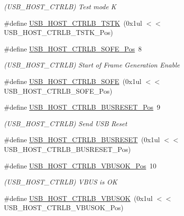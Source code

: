 \begin{DoxyCompactItemize}
\begin{DoxyCompactList}\small\item\em (U\+S\+B\+\_\+\+H\+O\+S\+T\+\_\+\+C\+T\+R\+LB) Test mode K \end{DoxyCompactList}\item 
\#define \mbox{\hyperlink{group___s_a_m_d21___u_s_b_ga57d13e780ef59d8be1e7df0109e82893}{U\+S\+B\+\_\+\+H\+O\+S\+T\+\_\+\+C\+T\+R\+L\+B\+\_\+\+T\+S\+TK}}~(0x1ul $<$$<$ U\+S\+B\+\_\+\+H\+O\+S\+T\+\_\+\+C\+T\+R\+L\+B\+\_\+\+T\+S\+T\+K\+\_\+\+Pos)
\item 
\#define \mbox{\hyperlink{group___s_a_m_d21___u_s_b_gae4d95883d4ad56f9856b6e00dfb86871}{U\+S\+B\+\_\+\+H\+O\+S\+T\+\_\+\+C\+T\+R\+L\+B\+\_\+\+S\+O\+F\+E\+\_\+\+Pos}}~8
\begin{DoxyCompactList}\small\item\em (U\+S\+B\+\_\+\+H\+O\+S\+T\+\_\+\+C\+T\+R\+LB) Start of Frame Generation Enable \end{DoxyCompactList}\item 
\#define \mbox{\hyperlink{group___s_a_m_d21___u_s_b_ga385275d4296469359bbde42207566864}{U\+S\+B\+\_\+\+H\+O\+S\+T\+\_\+\+C\+T\+R\+L\+B\+\_\+\+S\+O\+FE}}~(0x1ul $<$$<$ U\+S\+B\+\_\+\+H\+O\+S\+T\+\_\+\+C\+T\+R\+L\+B\+\_\+\+S\+O\+F\+E\+\_\+\+Pos)
\item 
\#define \mbox{\hyperlink{group___s_a_m_d21___u_s_b_ga926f0460d7d0258193ba846808be7267}{U\+S\+B\+\_\+\+H\+O\+S\+T\+\_\+\+C\+T\+R\+L\+B\+\_\+\+B\+U\+S\+R\+E\+S\+E\+T\+\_\+\+Pos}}~9
\begin{DoxyCompactList}\small\item\em (U\+S\+B\+\_\+\+H\+O\+S\+T\+\_\+\+C\+T\+R\+LB) Send U\+SB Reset \end{DoxyCompactList}\item 
\#define \mbox{\hyperlink{group___s_a_m_d21___u_s_b_gaacb998f960d58b73fd84aa4746026de7}{U\+S\+B\+\_\+\+H\+O\+S\+T\+\_\+\+C\+T\+R\+L\+B\+\_\+\+B\+U\+S\+R\+E\+S\+ET}}~(0x1ul $<$$<$ U\+S\+B\+\_\+\+H\+O\+S\+T\+\_\+\+C\+T\+R\+L\+B\+\_\+\+B\+U\+S\+R\+E\+S\+E\+T\+\_\+\+Pos)
\item 
\#define \mbox{\hyperlink{group___s_a_m_d21___u_s_b_ga053fa0f43fd5f012f1a40d99b740f212}{U\+S\+B\+\_\+\+H\+O\+S\+T\+\_\+\+C\+T\+R\+L\+B\+\_\+\+V\+B\+U\+S\+O\+K\+\_\+\+Pos}}~10
\begin{DoxyCompactList}\small\item\em (U\+S\+B\+\_\+\+H\+O\+S\+T\+\_\+\+C\+T\+R\+LB) V\+B\+US is OK \end{DoxyCompactList}\item 
\#define \mbox{\hyperlink{group___s_a_m_d21___u_s_b_gaefdde4c742f32db15403c5887913e226}{U\+S\+B\+\_\+\+H\+O\+S\+T\+\_\+\+C\+T\+R\+L\+B\+\_\+\+V\+B\+U\+S\+OK}}~(0x1ul $<$$<$ U\+S\+B\+\_\+\+H\+O\+S\+T\+\_\+\+C\+T\+R\+L\+B\+\_\+\+V\+B\+U\+S\+O\+K\+\_\+\+Pos)

\end{DoxyCompactItemize}
